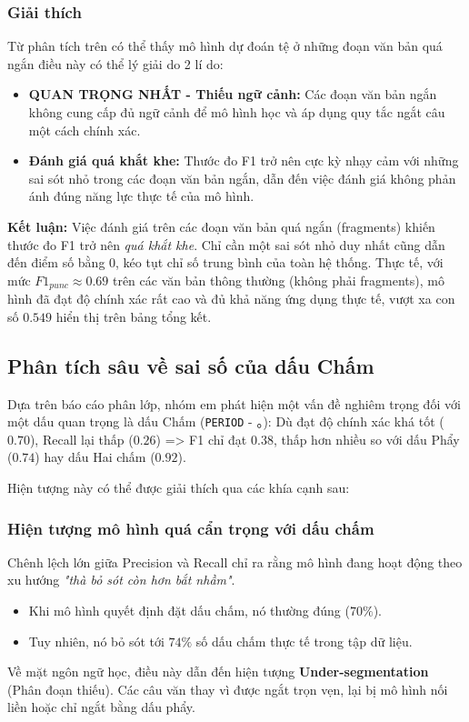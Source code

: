 \subsubsection{Giải thích}
Từ phân tích trên có thể thấy mô hình dự đoán tệ ở những đoạn văn bản quá ngắn điều này có thể lý giải do 2 lí do:
\begin{itemize}
    \item \textbf{QUAN TRỌNG NHẤT - Thiếu ngữ cảnh:} Các đoạn văn bản ngắn không cung cấp đủ ngữ cảnh để mô hình học và áp dụng quy tắc ngắt câu một cách chính xác.
    \item \textbf{Đánh giá quá khắt khe:} Thước đo F1 trở nên cực kỳ nhạy cảm với những sai sót nhỏ trong các đoạn văn bản ngắn, dẫn đến việc đánh giá không phản ánh đúng năng lực thực tế của mô hình.
\end{itemize}

\textbf{Kết luận:} Việc đánh giá trên các đoạn văn bản quá ngắn (fragments) khiến thước đo F1 trở nên \textit{quá khắt khe}. Chỉ cần một sai sót nhỏ duy nhất cũng dẫn đến điểm số bằng 0, kéo tụt chỉ số trung bình của toàn hệ thống. Thực tế, với mức $F1_{punc} \approx 0.69$ trên các văn bản thông thường (không phải fragments), mô hình đã đạt độ chính xác rất cao và đủ khả năng ứng dụng thực tế, vượt xa con số $0.549$ hiển thị trên bảng tổng kết.

\subsection{Phân tích sâu về sai số của dấu Chấm}

Dựa trên báo cáo phân lớp, nhóm em phát hiện một vấn đề nghiêm trọng đối với một dấu quan trọng là dấu Chấm (\texttt{PERIOD} - 。): Dù đạt độ chính xác khá tốt ($0.70$), Recall lại thấp ($0.26$) => F1 chỉ đạt $0.38$, thấp hơn nhiều so với dấu Phẩy ($0.74$) hay dấu Hai chấm ($0.92$).

Hiện tượng này có thể được giải thích qua các khía cạnh sau:

\subsubsection{Hiện tượng mô hình quá cẩn trọng với dấu chấm}
Chênh lệch lớn giữa Precision và Recall chỉ ra rằng mô hình đang hoạt động theo xu hướng \textit{"thà bỏ sót còn hơn bắt nhầm"}. 
\begin{itemize}
    \item Khi mô hình quyết định đặt dấu chấm, nó thường đúng ($70\%$).
    \item Tuy nhiên, nó bỏ sót tới $74\%$ số dấu chấm thực tế trong tập dữ liệu.
\end{itemize}
Về mặt ngôn ngữ học, điều này dẫn đến hiện tượng \textbf{Under-segmentation} (Phân đoạn thiếu). Các câu văn thay vì được ngắt trọn vẹn, lại bị mô hình nối liền hoặc chỉ ngắt bằng dấu phẩy.

